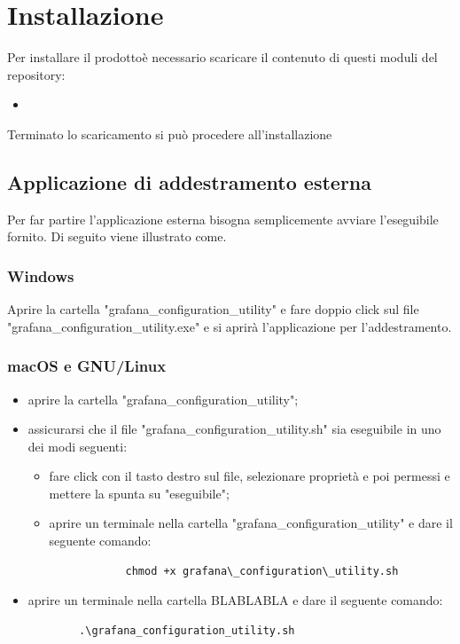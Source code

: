 \section{Installazione}
Per installare il prodotto\glosp è necessario scaricare il contenuto di questi moduli del repository:
\begin{itemize}
	\item 
\end{itemize}
Terminato lo scaricamento si può procedere all'installazione

\subsection{Applicazione di addestramento esterna}
Per far partire l'applicazione esterna bisogna semplicemente avviare l'eseguibile fornito. Di seguito viene illustrato come.
	\subsubsection{Windows}
	Aprire la cartella "grafana\_configuration\_utility" e fare doppio click sul file "grafana\_configuration\_utility.exe" e si aprirà l'applicazione per l'addestramento.

	\subsubsection{macOS e GNU/Linux}
	\begin{itemize}
		\item aprire la cartella "grafana\_configuration\_utility";
		\item assicurarsi che il file "grafana\_configuration\_utility.sh" sia eseguibile in uno dei modi seguenti:
		\begin{itemize}
			\item fare click con il tasto destro sul file, selezionare proprietà e poi permessi e mettere la spunta su "eseguibile";
			\item aprire un terminale nella cartella "grafana\_configuration\_utility" e dare il seguente comando: 
			\begin{verbatim}
			chmod +x grafana\_configuration\_utility.sh
			\end{verbatim}
		\end{itemize}
		\item aprire un terminale nella cartella BLABLABLA e dare il seguente comando:
		\begin{verbatim}
	    .\grafana_configuration_utility.sh
		\end{verbatim}
	\end{itemize}
